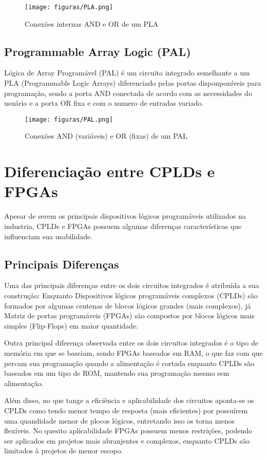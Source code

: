 \begin{figure}[ht]
\centering
\texttt{[image: figuras/PLA.png]}
\caption{Conexões internas AND e OR de um PLA}
\label{fig:exampleFig1}
\end{figure}

\subsection{\esp Programmable Array Logic (PAL)}
Lógica de Array Programável (PAL) é um circuito integrado semelhante a um PLA (Programmable Logic Arrays) diferenciado pelas portas disponponíveis para programação, sendo a porta AND conectada de acordo com as necessidades do usuário e a porta OR fixa e com o numero de entradas variado.

\begin{figure}[ht]
\centering
\texttt{[image: figuras/PAL.png]}
\caption{Conexões AND (variáveis) e OR (fixas) de um PAL}
\label{fig:exampleFig2}
\end{figure}



\section{\esp Diferenciação entre CPLDs e FPGAs}

Apesar de serem os principais dispositivos lógicos programáveis utilizados na industria, CPLDs e FPGAs possuem algumas diferenças características que influenciam sua usabilidade.

\subsection{\esp Principais Diferenças}
Uma das principais diferenças entre os dois circuitos integrados é atribuída a sua construção: Enquanto Dispositivos lógicos programáveis complexos (CPLDs) são formados por algumas centenas de blocos lógicos grandes (mais complexos), já Matriz de portas programáveis (FPGAs) são compostos por blocos lógicos mais simples (Flip-Flops) em maior quantidade.

Outra principal diferença observada entre os dois circuitos integrados é o tipo de memória em que se baseiam, sendo FPGAs baseados em RAM, o que faz com que percam sua programação quando a alimentação é cortada enquanto CPLDs são baseados em um tipo de ROM, mantendo sua programação mesmo sem alimentação.

Além disso, no que tange a eficiência e aplicabilidade dos circuitos aponta-se os CPLDs como tendo menor tempo de resposta (mais eficientes) por possuírem uma quandidade menor de plocos lógicos, entretando isso os torna menos flexíveis. No quesito aplicabilidade FPGAs possuem menos restrições, podendo ser aplicados em projetos mais abranjentes e complexos, enquanto CPLDs são limitados à projetos de menor escopo.


